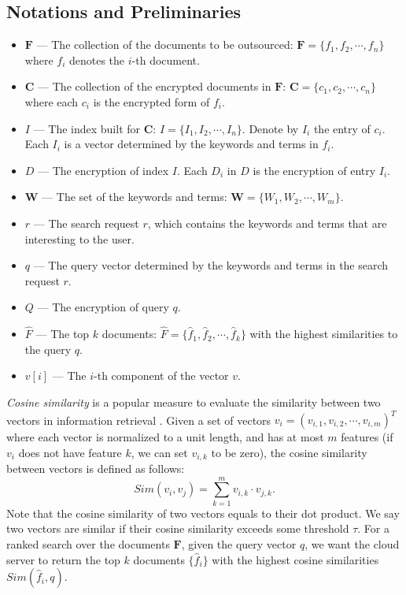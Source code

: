 \documentclass{article}
\begin{document}
\subsection{Notations and Preliminaries}
\label{sec:prelim}
\begin{itemize}
\item $\mathbf{F}$ \---- The collection of the documents to be outsourced: $\mathbf{F} = \{f_1, f_2, \cdots, f_n\}$ where $f_i$ denotes the $i$-th document.
\item $\mathbf{C}$ \---- The collection of the encrypted documents in $\mathbf{F}$: $\mathbf{C} = \{c_1, c_2, \cdots, c_n\}$ where each $c_i$ is the encrypted form of $f_i$.
\item $I$ \---- The index built for $\mathbf{C}$: $I = \{I_1, I_2, \cdots, I_n\}$. Denote by $I_i$ the entry of $c_i$. Each $I_i$ is a vector determined by the keywords and terms in $f_i$.
\item $D$ \---- The encryption of index $I$. Each $D_i$ in $D$ is the encryption of entry $I_i$.
\item $\mathbf{W}$ \---- The set of the keywords and terms: $\mathbf{W} = \{W_1, W_2, \cdots, W_m\}$.
\item $r$ \---- The search request $r$, which contains the keywords and terms that are interesting to the user.
\item $q$ \---- The query vector determined by the keywords and terms in the search request $r$.
\item $Q$ \---- The encryption of query $q$.
\item $\hat{F}$ \---- The top $k$ documents: $\hat{F} = \{\hat{f}_1, \hat{f}_2, \cdots, \hat{f}_k\}$ with the highest similarities to the query $q$.
\item $v[i]$ \---- The $i$-th component of the vector $v$.
\end{itemize}

\emph{Cosine similarity} is a popular measure to evaluate the similarity between two vectors in information retrieval \cite{Sun13,ATY13,TAJY14}. Given a set of vectors $v_i = (v_{i,1}, v_{i,2}, \cdots, v_{i,m})^T$ where each vector is normalized to a unit length, and has at most $m$ features (if $v_i$ does not have feature $k$, we can set $v_{i,k}$ to be zero), the cosine similarity between vectors is defined as follows:
$$Sim(v_i,v_j) = \sum_{k=1}^m v_{i,k}\cdot v_{j,k}.$$
Note that the cosine similarity of two vectors equals to their dot product. We say two vectors are similar if their cosine similarity exceeds some threshold $\tau$. For a ranked search over the documents $\mathbf{F}$, given the query vector $q$, we want the cloud server to return the top $k$ documents $\{\hat{f}_i\}$ with the highest cosine similarities $Sim(\hat{f}_i, q)$.
\end{document}
